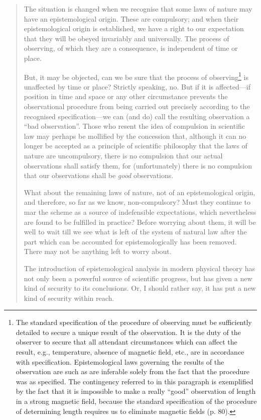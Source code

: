 \begin{quote}
    The situation is changed when we recognise that some laws of nature may have an epistemological origin.  These are compulsory; and when their epistemological origin is established, we have a right to our expectation that they will be obeyed invariably and universally.  The process of observing, of which they are a consequence, is independent of time or place.
    
    But, it may be objected, can we be sure that the process of observing\footnote{The standard specification of the procedure of observing must be sufficiently detailed to secure a unique result of the observation.  It is the duty of the observer to secure that all attendant circumstances which can affect the result, e.g., temperature, absence of magnetic field, etc., are in accordance with specification.  Epistemological laws governing the results of the observation are such as are inferable solely from the fact that the procedure was as specified.  The contingency referred to in this paragraph is exemplified by the fact that it is impossible to make a really ``good'' observation of length in a strong magnetic field, because the standard specification of the procedure of determining length requires us to eliminate magnetic fields (p. 80).} is unaffected by time or place?  Strictly speaking, no.  But if it is affected---if position in time and space or any other circumstance prevents the observational procedure from being carried out precisely according to the recognised specification---we can (and do) call the resulting observation a ``bad observation''.  Those who resent the idea of compulsion in scientific law may perhaps be mollified by the concession that, although it can no longer be accepted as a principle of scientific philosophy that the laws of nature are uncompulsory, there is no compulsion that our actual observations shall satisfy them, for (unfortunately) there is no compulsion that our observations shall be \emph{good} observations.
    
    What about the remaining laws of nature, not of an epistemological origin, and therefore, so far as we know, non-compulsory?  Must they continue to mar the scheme as a source of indefensible expectations, which nevertheless are found to be fulfilled in practice?  Before worrying about them, it will be well to wait till we see what is left of the system of natural law after the part which can be accounted for epistemologically has been removed.  There may not be anything left to worry about.  
    
    The introduction of epistemological analysis in modern physical theory has not only been a powerful source of scientific progress, but has given a new kind of security to its conclusions.  Or, I should rather say, it has put a new kind of security within reach.  
    
    \citep[p. 20-21]{Eddington1939}
\end{quote}



